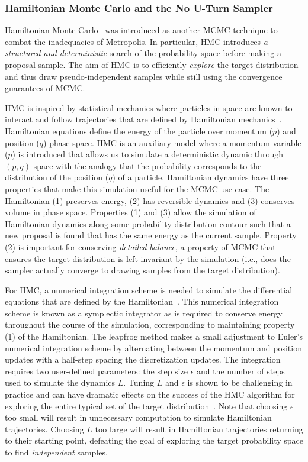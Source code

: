 \subsubsection{Hamiltonian Monte Carlo and the No U-Turn Sampler}\label{sec:hmc_nuts}

Hamiltonian Monte Carlo~\citep{neal2011mcmc} was introduced as another MCMC technique to combat the inadequacies of Metropolis. In particular, HMC introduces \textit{a structured and deterministic} search of the probability space before making a proposal sample. The aim of HMC is to efficiently \textit{explore} the target distribution and thus draw pseudo-independent samples while still using the convergence guarantees of MCMC.

HMC is inspired by statistical mechanics where particles in space are known to interact and follow trajectories that are defined by Hamiltonian mechanics~\citep{neal2011mcmc}. Hamiltonian equations define the energy of the particle over momentum ($p$) and position ($q$) phase space. HMC is an auxiliary model where a momentum variable ($p$) is introduced that allows us to simulate a deterministic dynamic through $(p,q)$ space with the analogy that the probability corresponds to the distribution of the position ($q$) of a particle. Hamiltonian dynamics have three properties that make this simulation useful for the MCMC use-case. The Hamiltonian (1) preserves energy, (2) has reversible dynamics and (3) conserves volume in phase space. Properties (1) and (3) allow the simulation of Hamiltonian dynamics along some probability distribution contour such that a new proposal is found that has the same energy as the current sample. Property (2) is important for conserving \textit{detailed balance}, a property of MCMC that ensures the target distribution is left invariant by the simulation (i.e., does the sampler actually converge to drawing samples from the target distribution).

For HMC, a numerical integration scheme is needed to simulate the differential equations that are defined by the Hamiltonian~\citep{neal2011mcmc}. This numerical integration scheme is known as a symplectic integrator as is required to conserve energy throughout the course of the simulation, corresponding to maintaining property (1) of the Hamiltonian. The leapfrog method makes a small adjustment to Euler's numerical integration scheme by alternating between the momentum and position updates with a half-step spacing the discretization updates. The integration requires two user-defined parameters: the step size $\epsilon$ and the number of steps used to simulate the dynamics $L$. Tuning $L$ and $\epsilon$ is shown to be challenging in practice and can have dramatic effects on the success of the HMC algorithm for exploring the entire typical set of the target distribution~\citep{hoffman2014no}. Note that choosing $\epsilon$ too small will result in unnecessary computation to simulate Hamiltonian trajectories. Choosing $L$ too large will result in Hamiltonian trajectories returning to their starting point, defeating the goal of exploring the target probability space to find \textit{independent} samples.

